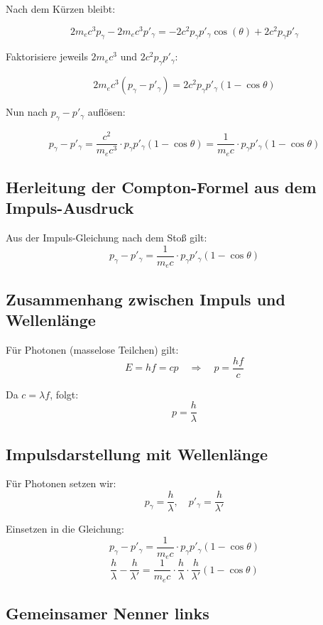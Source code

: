 Nach dem Kürzen bleibt:

\[
2 m_e c^3 p_\gamma - 2 m_e c^3 p'_\gamma = -2 c^2 p_\gamma p'_\gamma \cos(\theta) + 2 c^2 p_\gamma p'_\gamma
\]

Faktorisiere jeweils \( 2 m_e c^3 \) und \( 2 c^2 p_\gamma p'_\gamma \):

\[
2 m_e c^3 (p_\gamma - p'_\gamma) = 2 c^2 p_\gamma p'_\gamma (1 - \cos\theta)
\]

Nun nach \( p_\gamma - p'_\gamma \) auflösen:

\[
p_\gamma - p'_\gamma = \frac{c^2}{m_e c^3} \cdot p_\gamma p'_\gamma (1 - \cos\theta)
= \frac{1}{m_e c} \cdot p_\gamma p'_\gamma (1 - \cos\theta)
\]






\subsection{Herleitung der Compton-Formel aus dem Impuls-Ausdruck}

Aus der Impuls-Gleichung nach dem Stoß gilt:
\[
p_\gamma - p'_\gamma = \frac{1}{m_e c} \cdot p_\gamma p'_\gamma (1 - \cos\theta)
\]

\subsection*{Zusammenhang zwischen Impuls und Wellenlänge}

Für Photonen (masselose Teilchen) gilt:
\[
E = h f = c p \quad \Rightarrow \quad p = \frac{h f}{c}
\]

Da \( c = \lambda f \), folgt:
\[
p = \frac{h}{\lambda}
\]


\subsection*{ Impulsdarstellung mit Wellenlänge}

Für Photonen setzen wir:
\[
p_\gamma = \frac{h}{\lambda}, \quad p'_\gamma = \frac{h}{\lambda'}
\]

Einsetzen in die Gleichung:
\[
p_\gamma - p'_\gamma = \frac{1}{m_e c} \cdot p_\gamma p'_\gamma (1 - \cos\theta)
\]
\[
\frac{h}{\lambda} - \frac{h}{\lambda'} = \frac{1}{m_e c} \cdot \frac{h}{\lambda} \cdot \frac{h}{\lambda'} (1 - \cos\theta)
\]

\subsection*{Gemeinsamer Nenner links}

